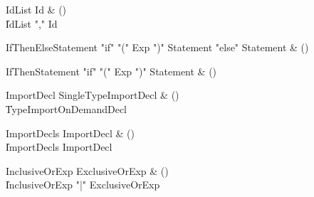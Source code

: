 \begin{bbgrammar}

IdList \label{prod:IdList}  \: Id & () \\

    \| IdList \xcd"," Id \\

\end{bbgrammar}

\begin{bbgrammar}

IfThenElseStatement \label{prod:IfThenElseStatement}  \: \xcd"if" \xcd"(" Exp \xcd")" Statement  \xcd"else" Statement  & () \\


\end{bbgrammar}

\begin{bbgrammar}

IfThenStatement \label{prod:IfThenStatement}  \: \xcd"if" \xcd"(" Exp \xcd")" Statement & () \\


\end{bbgrammar}

\begin{bbgrammar}

ImportDecl \label{prod:ImportDecl}  \: SingleTypeImportDecl & () \\

    \| TypeImportOnDemandDecl \\

\end{bbgrammar}

\begin{bbgrammar}

ImportDecls \label{prod:ImportDecls}  \: ImportDecl & () \\

    \| ImportDecls ImportDecl \\

\end{bbgrammar}

\begin{bbgrammar}

InclusiveOrExp \label{prod:InclusiveOrExp}  \: ExclusiveOrExp & () \\

    \| InclusiveOrExp \xcd"|" ExclusiveOrExp \\

\end{bbgrammar}

